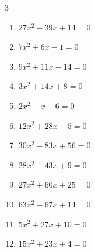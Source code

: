 \begin{multicols}{3}
\begin{enumerate}
\columnbreak %

  \item $27x^{2}-39x+14=0$


  \item $7x^{2}+6x-1=0$


  \item $9x^{2}+11x-14=0$


  \item $3x^{2}+14x+8=0$


  \item $2x^{2}-x-6=0$


  \item $12x^{2}+28x-5=0$


  \item $30x^{2}-83x+56=0$


  \item $28x^{2}-43x+9=0$


  \item $27x^{2}+60x+25=0$


  \item $63x^{2}-67x+14=0$


\columnbreak %

  \item $5x^{2}+27x+10=0$


  \item $15x^{2}+23x+4=0$



\end{enumerate}
\end{multicols}

